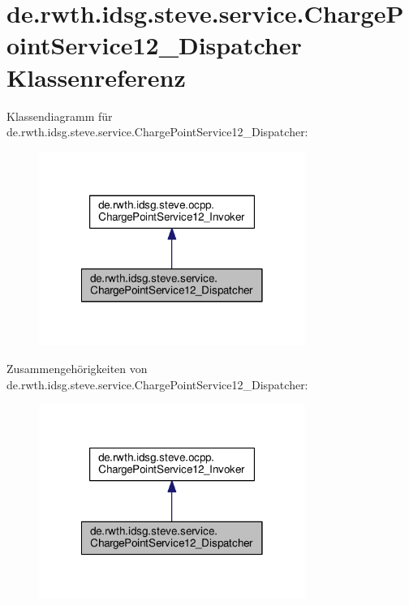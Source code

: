 \hypertarget{classde_1_1rwth_1_1idsg_1_1steve_1_1service_1_1_charge_point_service12___dispatcher}{\section{de.\-rwth.\-idsg.\-steve.\-service.\-Charge\-Point\-Service12\-\_\-\-Dispatcher Klassenreferenz}
\label{classde_1_1rwth_1_1idsg_1_1steve_1_1service_1_1_charge_point_service12___dispatcher}
}


Klassendiagramm für de.\-rwth.\-idsg.\-steve.\-service.\-Charge\-Point\-Service12\-\_\-\-Dispatcher\-:
\nopagebreak
\begin{figure}[H]
\begin{center}
\leavevmode
\includegraphics[width=246pt]{classde_1_1rwth_1_1idsg_1_1steve_1_1service_1_1_charge_point_service12___dispatcher__inherit__graph}
\end{center}
\end{figure}


Zusammengehörigkeiten von de.\-rwth.\-idsg.\-steve.\-service.\-Charge\-Point\-Service12\-\_\-\-Dispatcher\-:
\nopagebreak
\begin{figure}[H]
\begin{center}
\leavevmode
\includegraphics[width=246pt]{classde_1_1rwth_1_1idsg_1_1steve_1_1service_1_1_charge_point_service12___dispatcher__coll__graph}
\end{center}
\end{figure}
